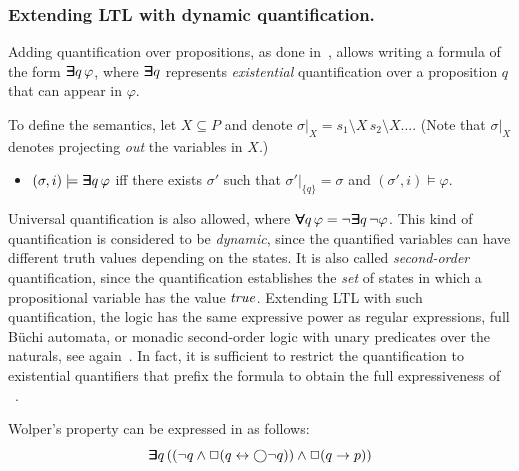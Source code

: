 \subsubsection{Extending LTL with dynamic quantification.}
Adding quantification over propositions, as done in~\cite{Wolper}, allows writing a formula of the form
$\bm{\exists}\kern-0.6em\bm{\exists} q \, \varphi$, where
$\bm{\exists}\kern-0.6em\bm{\exists} q$ represents {\em existential} quantification over a proposition $q$ that can appear in $\varphi$.

To define the semantics, let $X \subseteq P$ 
and denote $\sigma |_X = s_1 \setminus X \, s_2 \setminus X \ldots$. (Note that $\sigma |_X$ denotes projecting {\em out} the variables in $X$.)



\begin{itemize}
\item $( \sigma, i ) \models \boldsymbol{\bm{\exists}\kern-0.6em\bm{\exists}} q \, \varphi$ iff there exists
$\sigma'$ such that $\sigma' |_{\{ q \} } = \sigma$ and 
$( \sigma', i) \models \varphi$.
\end{itemize}
%
%
Universal quantification is also allowed, where $\bm{\forall}\kern-0.6em\bm{\forall} q\, \varphi =
\neg \bm{\exists}\kern-0.6em\bm{\exists} q\, \neg \varphi$.
This kind of quantification is considered to be {\em dynamic}, since the quantified variables can have different truth values depending on the states. It is also called  {\em second-order} quantification, since the quantification establishes the {\em set} of states in which a propositional variable has the value $\mathit{true}$.
Extending LTL with such quantification, the logic \QLTL{} has the same expressive power as regular expressions, full B\"{u}chi
automata, or monadic second-order logic with unary predicates over the naturals, see again~\cite{Thomas}.
In fact, it is sufficient to restrict the quantification to existential quantifiers that prefix the formula to obtain the full expressiveness of \QLTL{}~\cite{Thomas}. 

Wolper's property can be expressed in \QLTL{} as follows:
\begin{equation} \label{form0} \bm{\exists}\kern-0.6em\bm{\exists} q \,
( (  \neg q \wedge \Box (q \leftrightarrow \bigcirc \neg q )  )  \wedge \Box (q \rightarrow p ) )\end{equation}

